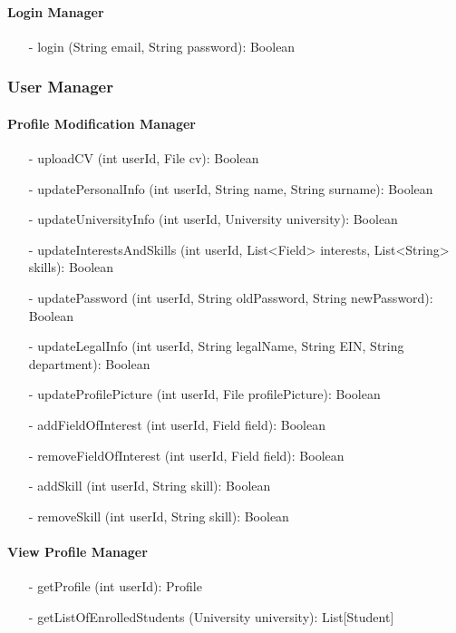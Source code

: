 \paragraph{Login Manager}
\begin{itemize}
    \item[-] login (String email, String password): Boolean
\end{itemize}


\subsubsection{User Manager}
\paragraph{Profile Modification Manager}
\begin{itemize}
    \item[-] uploadCV (int userId, File cv): Boolean
    \item[-] updatePersonalInfo (int userId, String name, String surname): Boolean
    \item[-] updateUniversityInfo (int userId, University university): Boolean
    \item[-] updateInterestsAndSkills (int userId, List<Field> interests, List<String> skills): Boolean
    \item[-] updatePassword (int userId, String oldPassword, String newPassword): Boolean
    \item[-] updateLegalInfo (int userId, String legalName, String EIN, String department): Boolean
    \item[-] updateProfilePicture (int userId, File profilePicture): Boolean
    \item[-] addFieldOfInterest (int userId, Field field): Boolean
    \item[-] removeFieldOfInterest (int userId, Field field): Boolean
    \item[-] addSkill (int userId, String skill): Boolean
    \item[-] removeSkill (int userId, String skill): Boolean
\end{itemize}

\paragraph{View Profile Manager}
\begin{itemize}
    \item[-] getProfile (int userId): Profile
    \item[-] getListOfEnrolledStudents (University university): List[Student]
\end{itemize}


